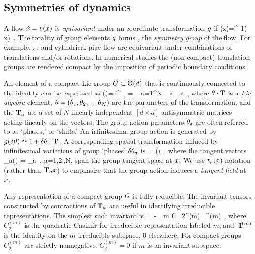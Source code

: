 \subsection{Symmetries of dynamics}
\label{sec:SymmDyn}

A flow $\dot{x}= v(x)$ is \emph{equivariant} under an coordinate
transformation $g$ if
\beq
\vel(x)=\LieEl^{-1}\vel(\LieEl \, x)
\,.
The totality of group elements
$g$ forms \Group, the {\em symmetry group} of the flow. For
example, \KSe{}, {\pCf}, and
cylindrical pipe flow are equivariant under
combinations of translations and/or rotations. In numerical studies the
(non-compact) translation groups are rendered compact by the imposition of
periodic boundary conditions.

An element of a compact Lie group $G \subset \textrm{O}(d)$ that is
continuously connected to the identity can be expressed as
\beq
\LieEl(\gSpace)=e^{{\gSpace} \cdot \Lg }
    \,,\qquad
\gSpace \cdot \Lg = \sum_{a=1}^N \gSpace_a \Lg_a
\,,
where ${\bf \theta} \cdot \mathbf{T} $ is a \emph{Lie algebra} element, ${\bf \theta}
= ({\bf \theta}_1,{\bf \theta}_2,\cdots{\bf \theta}_N)$ are the parameters of the
transformation, and the $\mathbf{T}_a$ are a set of $N$ linearly independent
$[d\!\times\!d]$ antisymmetric matrices acting linearly on the {\statesp}
vectors. The group action parameters ${\bf \theta}_a$ are often referred to as
`phases,' or `shifts.'
An infinitesimal group action is generated by
$
g(\delta {\bf \theta}) \simeq 1 + \delta {\bf \theta} \cdot \mathbf{T}
\,.
$ %
A corresponding spatial transformation induced by infinitesimal
variations of group `phases' $\delta {\bf \theta}_a$ is
\beq
\delta {\ssp} = \delta \gSpace \cdot \groupTan(\ssp)
\,,
where the tangent vectors
\beq
 \groupTan_{a}(\ssp) = \Lg _{a} \ssp
    \,,\qquad
 a=1,2,\cdots,N,
span the group tangent space at $x$. We use $t_a(x)$
notation (rather than $\mathbf{T}_{a}x$) to emphasize that the group action
induces a \emph{tangent field} at $x$.

Any representation of a compact group $G$ is fully
reducible. The invariant tensors constructed by contractions
of $\mathbf{T}_a$ are useful in identifying irreducible
representations. The simplest such invariant is
\beq
{\Lg} \cdot \Lg = - \sum_m C_2^{(m)} \, \id^{(m)}
\,,
where $C_2^{(m)}$ is the quadratic Casimir for irreducible representation
labeled $m$, and ${\ \hbox{{\rm 1}\kern-.6em\hbox{\rm 1}}}^{(m)}$ is the identity on the $m$-irreducible
subspace, 0 elsewhere. For compact groups $C_2^{(m)}$ are strictly
nonnegative. $C_2^{(m)} =0$ if $m$ is an invariant subspace.

